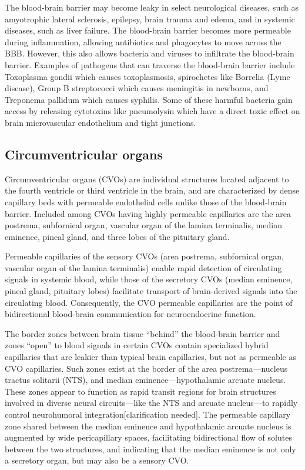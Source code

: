 \documentclass[]{book}
\begin{document}
The blood-brain barrier may become leaky in select neurological diseases, such as amyotrophic lateral sclerosis, epilepsy, brain trauma and edema, and in systemic diseases, such as liver failure. The blood-brain barrier becomes more permeable during inflammation, allowing antibiotics and phagocytes to move across the BBB. However, this also allows bacteria and viruses to infiltrate the blood-brain barrier. Examples of pathogens that can traverse the blood-brain barrier include Toxoplasma gondii which causes toxoplasmosis, spirochetes like Borrelia (Lyme disease), Group B streptococci which causes meningitis in newborns, and Treponema pallidum which causes syphilis. Some of these harmful bacteria gain access by releasing cytotoxins like pneumolysin which have a direct toxic effect on brain microvascular endothelium and tight junctions.

\hypertarget{circumventricular-organs}{%
\subsection{Circumventricular organs}\label{circumventricular-organs}}

Circumventricular organs (CVOs) are individual structures located adjacent to the fourth ventricle or third ventricle in the brain, and are characterized by dense capillary beds with permeable endothelial cells unlike those of the blood-brain barrier. Included among CVOs having highly permeable capillaries are the area postrema, subfornical organ, vascular organ of the lamina terminalis, median eminence, pineal gland, and three lobes of the pituitary gland.

Permeable capillaries of the sensory CVOs (area postrema, subfornical organ, vascular organ of the lamina terminalis) enable rapid detection of circulating signals in systemic blood, while those of the secretory CVOs (median eminence, pineal gland, pituitary lobes) facilitate transport of brain-derived signals into the circulating blood. Consequently, the CVO permeable capillaries are the point of bidirectional blood-brain communication for neuroendocrine function.

The border zones between brain tissue ``behind'' the blood-brain barrier and zones ``open'' to blood signals in certain CVOs contain specialized hybrid capillaries that are leakier than typical brain capillaries, but not as permeable as CVO capillaries. Such zones exist at the border of the area postrema---nucleus tractus solitarii (NTS), and median eminence---hypothalamic arcuate nucleus. These zones appear to function as rapid transit regions for brain structures involved in diverse neural circuits---like the NTS and arcuate nucleus---to rapidly control neurohumoral integration{[}clarification needed{]}. The permeable capillary zone shared between the median eminence and hypothalamic arcuate nucleus is augmented by wide pericapillary spaces, facilitating bidirectional flow of solutes between the two structures, and indicating that the median eminence is not only a secretory organ, but may also be a sensory CVO.
\end{document}
